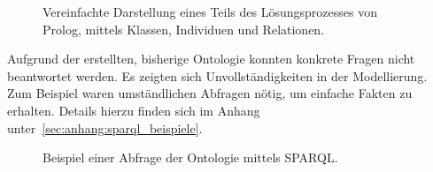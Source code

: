 \begin{figure}[H]
\centering {}
\caption{Vereinfachte Darstellung eines Teils des Lösungsprozesses von Prolog, mittels Klassen, Individuen und Relationen.\label{fig:prolog_loesungsprozess}\protect\footnotemark}
\end{figure}

Aufgrund der erstellten, bisherige Ontologie konnten konkrete Fragen nicht beantwortet werden. Es zeigten sich Unvollständigkeiten in der Modellierung. Zum Beispiel waren umständlichen Abfragen nötig, um einfache Fakten zu erhalten. Details hierzu finden sich im Anhang unter~\ref{sec:anhang:sparql_beispiele}.

\begin{figure}[H]
\centering {}
\caption{Beispiel einer Abfrage der Ontologie mittels SPARQL.\label{fig:sparql_beispiel}\protect\footnotemark}
\end{figure}

